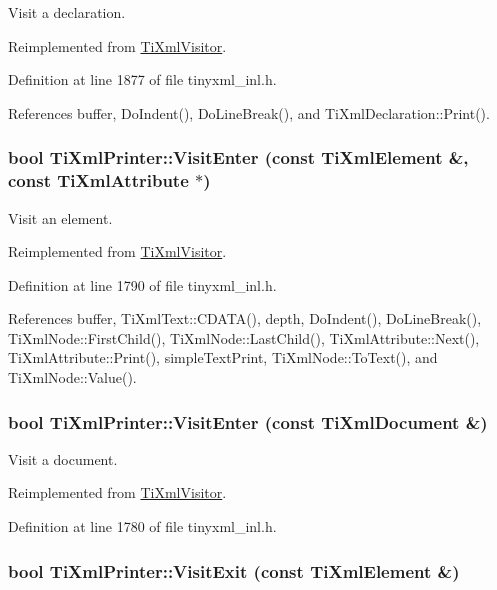 Visit a declaration. 

Reimplemented from \hyperlink{class_ti_xml_visitor_afad71c71ce6473fb9b4b64cd92de4a19}{TiXmlVisitor}.

Definition at line 1877 of file tinyxml\_\-inl.h.

References buffer, DoIndent(), DoLineBreak(), and TiXmlDeclaration::Print().\hypertarget{class_ti_xml_printer_a6dccaf5ee4979f13877690afe28721e8}{
\subsubsection[{VisitEnter}]{\setlength{\rightskip}{0pt plus 5cm}bool TiXmlPrinter::VisitEnter (const {\bf TiXmlElement} \&, \/  const {\bf TiXmlAttribute} $\ast$)}}
\label{class_ti_xml_printer_a6dccaf5ee4979f13877690afe28721e8}


Visit an element. 

Reimplemented from \hyperlink{class_ti_xml_visitor_af6c6178ffa517bbdba95d70490875fff}{TiXmlVisitor}.

Definition at line 1790 of file tinyxml\_\-inl.h.

References buffer, TiXmlText::CDATA(), depth, DoIndent(), DoLineBreak(), TiXmlNode::FirstChild(), TiXmlNode::LastChild(), TiXmlAttribute::Next(), TiXmlAttribute::Print(), simpleTextPrint, TiXmlNode::ToText(), and TiXmlNode::Value().\hypertarget{class_ti_xml_printer_a2ec73087db26ff4d2c4316c56f861db7}{
\subsubsection[{VisitEnter}]{\setlength{\rightskip}{0pt plus 5cm}bool TiXmlPrinter::VisitEnter (const {\bf TiXmlDocument} \&)}}
\label{class_ti_xml_printer_a2ec73087db26ff4d2c4316c56f861db7}


Visit a document. 

Reimplemented from \hyperlink{class_ti_xml_visitor_a07baecb52dd7d8716ae2a48ad0956ee0}{TiXmlVisitor}.

Definition at line 1780 of file tinyxml\_\-inl.h.\hypertarget{class_ti_xml_printer_ae6a1df8271df4bf62d7873c38e34aa69}{
\subsubsection[{VisitExit}]{\setlength{\rightskip}{0pt plus 5cm}bool TiXmlPrinter::VisitExit (const {\bf TiXmlElement} \&)}}
\label{class_ti_xml_printer_ae6a1df8271df4bf62d7873c38e34aa69}


